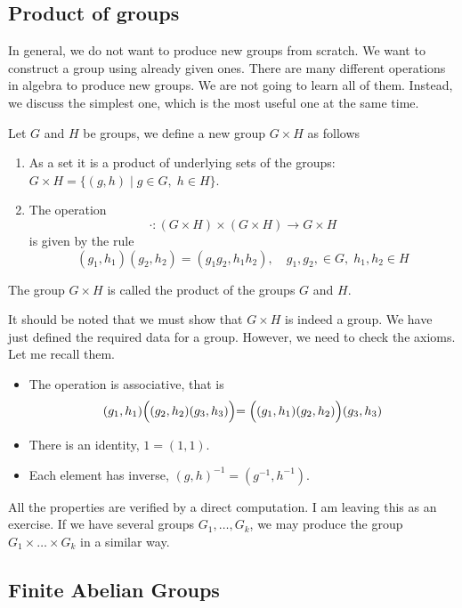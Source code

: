 \subsection{Product of groups}

In general, we do not want to produce new groups from scratch.
We want to construct a group using already given ones.
There are many different operations in algebra to produce new groups.
We are not going to learn all of them.
Instead, we discuss the simplest one, which is the most useful one at the same time.

\begin{definition}
Let $G$ and $H$ be groups, we define a new group $G\times H$ as follows
\begin{enumerate}
\item As a set it is a product of underlying sets of the groups: $G\times H = \{(g, h)\mid g\in G,\;h\in H\}$.

\item The operation 
\[
\cdot \colon (G\times H)\times (G\times H) \to G\times H
\]
is given by the rule
\[
(g_1, h_1) (g_2, h_2) = (g_1 g_2, h_1 h_2),\quad g_1, g_2,\in G, \;h_1, h_2\in H
\]
\end{enumerate}
The group $G\times H$ is called the product of the groups $G$ and $H$.
\end{definition}

It should be noted that we must show that $G\times H$ is indeed a group.
We have just defined the required data for a group.
However, we need to check the axioms.
Let me recall them.
\begin{itemize}
\item The operation is associative, that is
\[
(g_1, h_1)\Bigl( (g_2, h_2) (g_3, h_3) \Bigl) = \Bigl((g_1, h_1) (g_2, h_2)\Bigl) (g_3, h_3)
\]

\item There is an identity, $1 = (1, 1)$.

\item Each element has inverse,  $(g, h)^{-1} = (g^{-1}, h^{-1})$.
\end{itemize}
All the properties are verified by a direct computation.
I am leaving this as an exercise.
If we have several groups $G_1,\ldots,G_k$, we may produce the group $G_1\times \ldots \times G_k$ in a similar way.

\subsection{Finite Abelian Groups}

